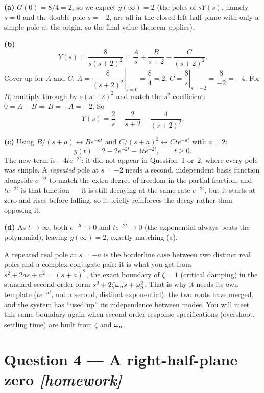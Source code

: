 \documentclass[11pt,a4paper]{article}
\newcommand{\athome}{\hfill{\small\color{fflag}\itshape[homework]}}
\begin{document}
\begin{solution}
\textbf{(a)} $G(0)=8/4=2$, so we expect $y(\infty)=2$ (the poles of $sY(s)$,
namely $s=0$ and the double pole $s=-2$, are all in the closed left half
plane with only a simple pole at the origin, so the final value theorem
applies).

\medskip
\textbf{(b)}
\[
  Y(s)=\frac{8}{s(s+2)^2}=\frac{A}{s}+\frac{B}{s+2}+\frac{C}{(s+2)^2}.
\]
Cover-up for $A$ and $C$: $A=\left.\dfrac{8}{(s+2)^2}\right|_{s=0}=\dfrac{8}{4}=2$;
$C=\left.\dfrac{8}{s}\right|_{s=-2}=\dfrac{8}{-2}=-4$. For $B$, multiply
through by $s(s+2)^2$ and match the $s^2$ coefficient: $0=A+B\Rightarrow
B=-A=-2$. So
\[
  Y(s)=\frac{2}{s}-\frac{2}{s+2}-\frac{4}{(s+2)^2}.
\]

\medskip
\textbf{(c)} Using $B/(s+a)\leftrightarrow Be^{-at}$ and
$C/(s+a)^2\leftrightarrow Cte^{-at}$ with $a=2$:
\[
  y(t)=2-2e^{-2t}-4te^{-2t},\qquad t\ge0.
\]
The new term is $-4te^{-2t}$: it did not appear in Question~1 or~2, where
every pole was simple. A \emph{repeated} pole at $s=-2$ needs a second,
independent basis function alongside $e^{-2t}$ to match the extra degree of
freedom in the partial fraction, and $te^{-2t}$ is that function --- it is
still decaying at the same rate $e^{-2t}$, but it starts at zero and rises
before falling, so it briefly reinforces the decay rather than opposing it.

\medskip
\textbf{(d)} As $t\to\infty$, both $e^{-2t}\to0$ and $te^{-2t}\to0$ (the
exponential always beats the polynomial), leaving $y(\infty)=2$, exactly
matching (a).
\end{solution}

\begin{keyidea}
A repeated real pole at $s=-a$ is the borderline case between two distinct
real poles and a complex-conjugate pair: it is what you get from
$s^2+2as+a^2=(s+a)^2$, the exact boundary of $\zeta=1$ (critical damping) in
the standard second-order form $s^2+2\zeta\omega_{n} s+\omega_{n}^2$. That is why it needs
its own template ($te^{-at}$, not a second, distinct exponential): the two
roots have merged, and the system has ``used up'' its independence between
modes. You will meet this same boundary again when second-order response
specifications (overshoot, settling time) are built from $\zeta$ and $\omega_{n}$.
\end{keyidea}

\section*{Question 4 --- A right-half-plane zero \athome}
\end{document}
